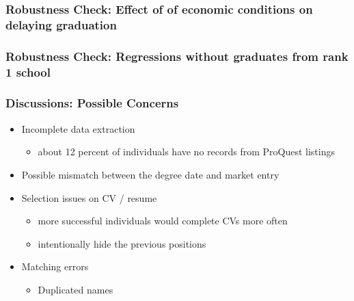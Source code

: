 \documentclass[11pt]{beamer}
\begin{document}
{
	\begin{frame}[label = delay]
		\frametitle{Robustness Check: Effect of of economic conditions on delaying graduation}
		 
	\end{frame}
}

{
	\begin{frame}[label = rank2]
		\frametitle{Robustness Check: Regressions without graduates from rank 1 school}
		 
	\end{frame}
}

\begin{frame}
\frametitle{Discussions: Possible Concerns}
	\begin{itemize}
		\item Incomplete data extraction
		\begin{itemize}
			\item about 12 percent of individuals have no records from ProQuest listings 
		\end{itemize}
		\vspace{1 mm}
		\item Possible mismatch between the degree date and market entry
		\vspace{1 mm}
		\item Selection issues on CV / resume
		\begin{itemize}
			\item more successful individuals would complete CVs more often   
			\item intentionally hide the previous positions
		\end{itemize}
		\item Matching errors
		\vspace{1 mm}
		\begin{itemize}
			\item Duplicated names
		\end{itemize}
	\end{itemize}
\end{frame}
\end{document}
